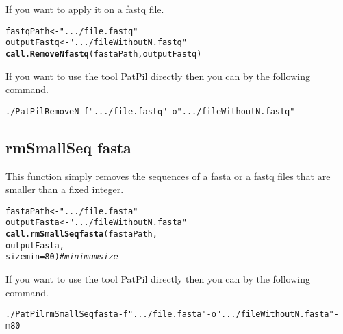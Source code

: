 \documentclass{article}\usepackage[]{graphicx}\usepackage[]{color}
\makeatletter
\newcommand{\hlnum}[1]{\textcolor[rgb]{0.686,0.059,0.569}{#1}}%
\newcommand{\hlstr}[1]{\textcolor[rgb]{0.192,0.494,0.8}{#1}}%
\newcommand{\hlcom}[1]{\textcolor[rgb]{0.678,0.584,0.686}{\textit{#1}}}%
\newcommand{\hlstd}[1]{\textcolor[rgb]{0.345,0.345,0.345}{#1}}%
\newcommand{\hlkwb}[1]{\textcolor[rgb]{0.69,0.353,0.396}{#1}}%
\newcommand{\hlkwc}[1]{\textcolor[rgb]{0.333,0.667,0.333}{#1}}%
\newcommand{\hlkwd}[1]{\textcolor[rgb]{0.737,0.353,0.396}{\textbf{#1}}}%
\newenvironment{kframe}{%
 \def\at@end@of@kframe{}%
 \ifinner\ifhmode%
  \def\at@end@of@kframe{\end{minipage}}%
  \begin{minipage}{\columnwidth}%
 \fi\fi%
 \def\FrameCommand##1{\hskip\@totalleftmargin \hskip-\fboxsep
 \colorbox{shadecolor}{##1}\hskip-\fboxsep
     \hskip-\linewidth \hskip-\@totalleftmargin \hskip\columnwidth}%
 \MakeFramed {\advance\hsize-\width
   \@totalleftmargin\z@ \linewidth\hsize
   \@setminipage}}%
 {\par\unskip\endMakeFramed%
 \at@end@of@kframe}
\newenvironment{knitrout}{}{} %
\makeatother
\begin{document}
If you want to apply it on a fastq file.

\begin{knitrout}
\color{fgcolor}\begin{kframe}
\begin{alltt}
\hlstd{fastqPath} \hlkwb{<-} \hlstr{".../file.fastq"}
\hlstd{outputFastq} \hlkwb{<-} \hlstr{".../fileWithoutN.fastq"}
\hlkwd{call.RemoveNfastq}\hlstd{(fastaPath,outputFastq)}
\end{alltt}
\end{kframe}
\end{knitrout}

If you want to use the tool PatPil directly then you can by the following command.
\begin{knitrout}
\color{fgcolor}\begin{kframe}
\begin{alltt}
./PatPil RemoveN -f \hlstr{".../file.fastq"} -o \hlstr{".../fileWithoutN.fastq"}
\end{alltt}
\end{kframe}
\end{knitrout}


\subsection{rmSmallSeq fasta}



This function simply removes the sequences of a fasta or a fastq files that are smaller than a fixed integer.

\begin{knitrout}
\color{fgcolor}\begin{kframe}
\begin{alltt}
\hlstd{fastaPath} \hlkwb{<-} \hlstr{".../file.fasta"}
\hlstd{outputFasta} \hlkwb{<-} \hlstr{".../fileWithoutN.fasta"}
\hlkwd{call.rmSmallSeqfasta}\hlstd{(fastaPath,}
        \hlstd{outputFasta,}
        \hlkwc{sizemin} \hlstd{=} \hlnum{80}\hlstd{)} \hlcom{# minimum size}
\end{alltt}
\end{kframe}
\end{knitrout}

If you want to use the tool PatPil directly then you can by the following command.
\begin{knitrout}
\color{fgcolor}\begin{kframe}
\begin{alltt}
./PatPil rmSmallSeqfasta -f \hlstr{".../file.fasta"} -o \hlstr{".../fileWithoutN.fasta"} -m 80
\end{alltt}
\end{kframe}
\end{knitrout}
\end{document}
